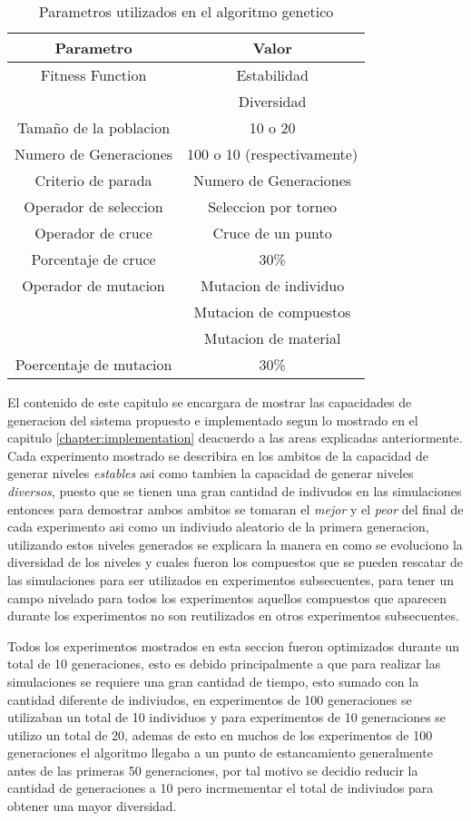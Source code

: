 \begin{table}[ht]
  \caption{Parametros utilizados en el algoritmo genetico}
  \label{table:parametros_ga}
  \centering
  \begin{tabular}{|c|c|}
  \hline
  Parametro & Valor \\
  \hline
  \hline
  Fitness Function & Estabilidad \\ & Diversidad \\
  \hline
  Tamaño de la poblacion & 10 o 20 \\
  \hline
  Numero de Generaciones & 100 o 10 (respectivamente) \\
  \hline
  Criterio de parada & Numero de Generaciones \\
  \hline
  Operador de seleccion & Seleccion por torneo \\
  \hline
  Operador de cruce & Cruce de un punto \\
  \hline
  Porcentaje de cruce & 30\% \\
  \hline
  Operador de mutacion & Mutacion de individuo \\ & Mutacion de compuestos \\ & Mutacion de material \\
  \hline
  Poercentaje de mutacion & 30\% \\
  \hline
  \end{tabular}
\end{table}


El contenido de este capitulo se encargara de mostrar las capacidades de
generacion del sistema propuesto e implementado segun lo mostrado en el capitulo
\ref{chapter:implementation} deacuerdo a las areas explicadas anteriormente.
Cada experimento mostrado se describira en los ambitos de la capacidad de
generar niveles \textit{estables} asi como tambien la capacidad de generar
niveles \textit{diversos}, puesto que se tienen una gran cantidad de indivudos
en las simulaciones entonces para demostrar ambos ambitos se tomaran el
\textit{mejor} y el \textit{peor} del final de cada experimento asi como un
indiviudo aleatorio de la primera generacion, utilizando estos niveles generados
se explicara la manera en como se evoluciono la diversidad de los niveles y
cuales fueron los compuestos que se pueden rescatar de las simulaciones para ser
utilizados en experimentos subsecuentes, para tener un campo nivelado para todos
los experimentos aquellos compuestos que aparecen durante los experimentos no
son reutilizados en otros experimentos subsecuentes.

Todos los experimentos mostrados en esta seccion fueron optimizados durante un
total de 10 generaciones, esto es debido principalmente a que para realizar las
simulaciones se requiere una gran cantidad de tiempo, esto sumado con la
cantidad diferente de indiviudos, en experimentos de 100 generaciones se
utilizaban un total de 10 individuos y para experimentos de 10 generaciones se
utilizo un total de 20, ademas de esto en muchos de los experimentos de 100
generaciones el algoritmo llegaba a un punto de estancamiento generalmente antes
de las primeras 50 generaciones, por tal motivo se decidio reducir la cantidad
de generaciones a 10 pero incrmementar el total de indiviudos para obtener una
mayor diversidad.

